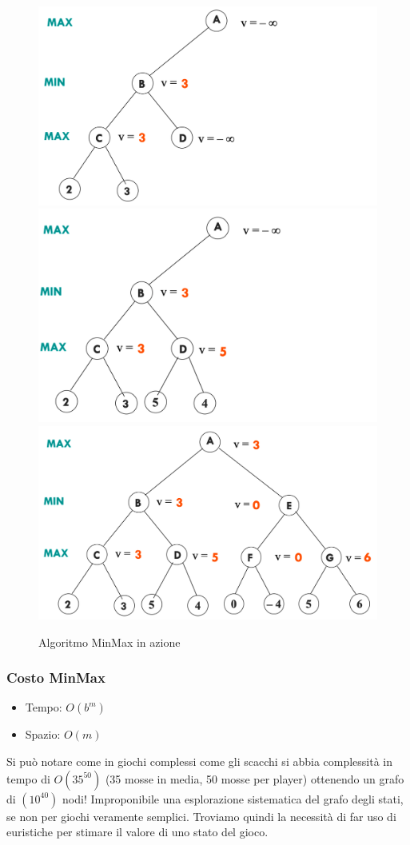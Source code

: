 \documentclass{article}
\begin{document}
\begin{figure}[h!]
\includegraphics[scale=0.15]{Images/minmaxaction4.png}
\includegraphics[scale=0.15]{Images/minmaxaction5.png}
\includegraphics[scale=0.15]{Images/minmaxaction6.png}
\caption{Algoritmo MinMax in azione}
\end{figure}
\subsubsection{Costo MinMax}
\begin{itemize}
    \item Tempo: $O(b^m)$
    \item Spazio: $O(m)$
\end{itemize}
Si può notare come in giochi complessi come gli scacchi si abbia complessità in tempo di $O(35^{50})$ (35 mosse in media, 50 mosse per player) ottenendo un grafo di $(10^{40})$ nodi! Improponibile una esplorazione sistematica del grafo degli stati, se non per giochi veramente semplici. Troviamo quindi la necessità di far uso di euristiche per stimare il valore di uno stato del gioco.
\end{document}
